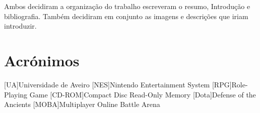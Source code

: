 \documentclass{report}
\begin{document}
Ambos decidiram a organização do trabalho escreveram o resumo, Introdução e bibliografia. Também decidiram em conjunto as imagens e descrições que iriam introduzir. 

\chapter*{Acrónimos}
\begin{acronym}
[UA]{Universidade de Aveiro}
[NES]{Nintendo Entertainment System}
[RPG]{Role-Playing Game}
[CD-ROM]{Compact Disc Read-Only Memory}
[Dota]{Defense of the Ancients}
[MOBA]{Multiplayer Online Battle Arena}
\end{acronym}


\printbibliography
\end{document}
